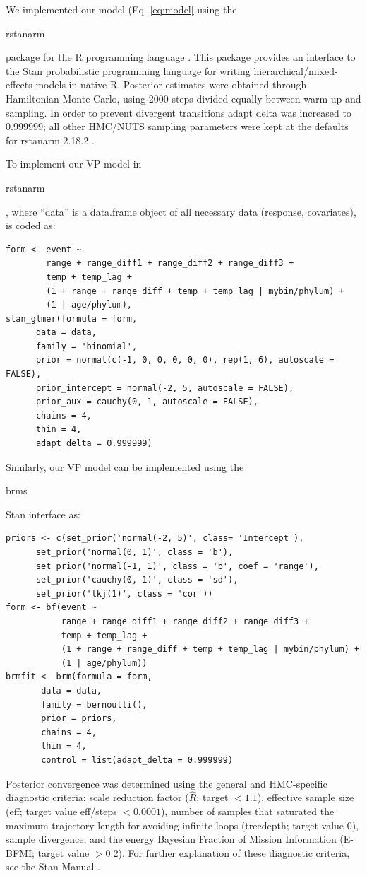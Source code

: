 \documentclass[12pt,letterpaper]{article}
\begin{document}
\begin{refsection}
We implemented our model (Eq. \ref{eq:model} using the \begin{texttt}rstanarm\end{texttt} package for the R programming language \citep{StanManual}. This package provides an interface to the Stan probabilistic programming language for writing hierarchical/mixed-effects models in native R. Posterior estimates were obtained through Hamiltonian Monte Carlo, using 2000 steps divided equally between warm-up and sampling. In order to prevent divergent transitions adapt delta was increased to 0.999999; all other HMC/NUTS sampling parameters were kept at the defaults for rstanarm 2.18.2 \citep{rstanarm}.

To implement our VP model in \begin{texttt}rstanarm\end{texttt}, where ``data'' is a data.frame object of all necessary data (response, covariates), is coded as:
\begin{verbatim}
form <- event ~ 
        range + range_diff1 + range_diff2 + range_diff3 + 
        temp + temp_lag + 
        (1 + range + range_diff + temp + temp_lag | mybin/phylum) + 
        (1 | age/phylum), 
stan_glmer(formula = form,
      data = data, 
      family = 'binomial',
      prior = normal(c(-1, 0, 0, 0, 0, 0), rep(1, 6), autoscale = FALSE), 
      prior_intercept = normal(-2, 5, autoscale = FALSE), 
      prior_aux = cauchy(0, 1, autoscale = FALSE), 
      chains = 4,
      thin = 4,
      adapt_delta = 0.999999)
\end{verbatim}

Similarly, our VP model can be implemented using the \begin{texttt}brms\end{texttt} Stan interface \citep{brms2017,brms2018} as:
\begin{verbatim}
priors <- c(set_prior('normal(-2, 5)', class= 'Intercept'),
      set_prior('normal(0, 1)', class = 'b'),
      set_prior('normal(-1, 1)', class = 'b', coef = 'range'),
      set_prior('cauchy(0, 1)', class = 'sd'),
      set_prior('lkj(1)', class = 'cor'))
form <- bf(event ~ 
           range + range_diff1 + range_diff2 + range_diff3 + 
           temp + temp_lag +
           (1 + range + range_diff + temp + temp_lag | mybin/phylum) +
           (1 | age/phylum))
brmfit <- brm(formula = form,
       data = data, 
       family = bernoulli(), 
       prior = priors,
       chains = 4, 
       thin = 4,
       control = list(adapt_delta = 0.999999)
\end{verbatim}

Posterior convergence was determined using the general and HMC-specific diagnostic criteria: scale reduction factor (\(\hat{R}\); target \(<1.1\)), effective sample size (eff; target value eff/steps \(<0.0001\)), number of samples that saturated the maximum trajectory length for avoiding infinite loops (treedepth; target value 0), sample divergence, and the energy Bayesian Fraction of Mission Information (E-BFMI; target value \(>0.2\)). For further explanation of these diagnostic criteria, see the Stan Manual \citep{StanManual}.


\printbibliography[title={Supplementary References}]
\end{refsection}
\end{document}
